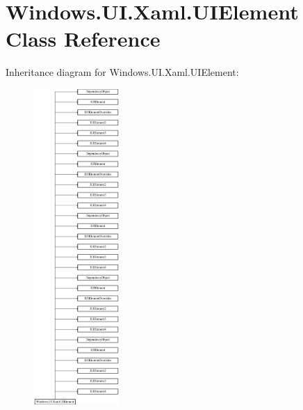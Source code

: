 \hypertarget{class_windows_1_1_u_i_1_1_xaml_1_1_u_i_element}{}\section{Windows.\+U\+I.\+Xaml.\+U\+I\+Element Class Reference}
\label{class_windows_1_1_u_i_1_1_xaml_1_1_u_i_element}
Inheritance diagram for Windows.\+U\+I.\+Xaml.\+U\+I\+Element\+:\begin{figure}[H]
\begin{center}
\leavevmode
\includegraphics[height=12.000000cm]{class_windows_1_1_u_i_1_1_xaml_1_1_u_i_element}
\end{center}
\end{figure}
